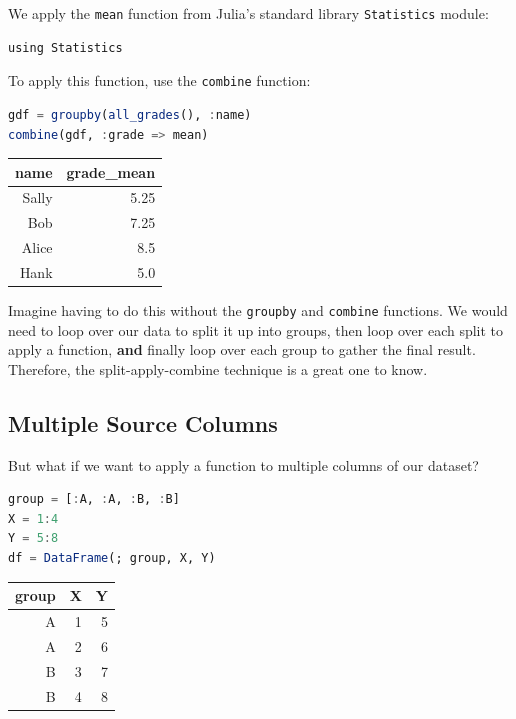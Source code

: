 \documentclass[
  notoc %
]{tufte-book}
\newcommand{\passthrough}[1]{#1}
\begin{document}
We apply the \passthrough{\lstinline!mean!} function from Julia's
standard library \passthrough{\lstinline!Statistics!} module:

\begin{lstlisting}
using Statistics
\end{lstlisting}

To apply this function, use the \passthrough{\lstinline!combine!}
function:

\begin{lstlisting}[language=Julia]
gdf = groupby(all_grades(), :name)
combine(gdf, :grade => mean)
\end{lstlisting}

\begin{longtable}[]{@{}rr@{}}
\toprule()
name & grade\_mean \\
\midrule()
\endhead
Sally & 5.25 \\
Bob & 7.25 \\
Alice & 8.5 \\
Hank & 5.0 \\
\bottomrule()
\end{longtable}

Imagine having to do this without the \passthrough{\lstinline!groupby!}
and \passthrough{\lstinline!combine!} functions. We would need to loop
over our data to split it up into groups, then loop over each split to
apply a function, \textbf{and} finally loop over each group to gather
the final result. Therefore, the split-apply-combine technique is a
great one to know.

\hypertarget{sec:groupby_combine_multiple_source}{%
\subsection{Multiple Source
Columns}\label{sec:groupby_combine_multiple_source}}

But what if we want to apply a function to multiple columns of our
dataset?

\begin{lstlisting}[language=Julia]
group = [:A, :A, :B, :B]
X = 1:4
Y = 5:8
df = DataFrame(; group, X, Y)
\end{lstlisting}

\begin{longtable}[]{@{}rrr@{}}
\toprule()
group & X & Y \\
\midrule()
\endhead
A & 1 & 5 \\
A & 2 & 6 \\
B & 3 & 7 \\
B & 4 & 8 \\
\bottomrule()
\end{longtable}
\end{document}
